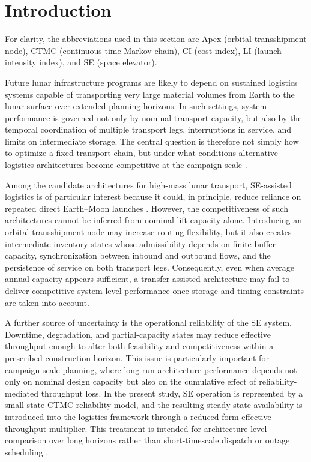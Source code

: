 \documentclass[12pt]{article}
\begin{document}
	\par\medskip
	
	\section{Introduction}
	
	For clarity, the abbreviations used in this section are Apex (orbital transshipment node), CTMC (continuous-time Markov chain), CI (cost index), LI (launch-intensity index), and SE (space elevator).
	
	Future lunar infrastructure programs are likely to depend on sustained logistics systems capable of transporting very large material volumes from Earth to the lunar surface over extended planning horizons. In such settings, system performance is governed not only by nominal transport capacity, but also by the temporal coordination of multiple transport legs, interruptions in service, and limits on intermediate storage. The central question is therefore not simply how to optimize a fixed transport chain, but under what conditions alternative logistics architectures become competitive at the campaign scale \cite{COMAP2026B,Merancy2025ADD,Azami2024LBMC,Xia2025LunarBaseInfra,Vasudeva2026LunarConstruction}.
	
	Among the candidate architectures for high-mass lunar transport, SE-assisted logistics is of particular interest because it could, in principle, reduce reliance on repeated direct Earth--Moon launches \cite{Smitherman2000SpaceElevators,Edwards2000NIAC,Chang2022,Nixon2023TetherMaterials,Swan2023ApexAnchorInitialResearch,Swan2025GalacticHarbours}. However, the competitiveness of such architectures cannot be inferred from nominal lift capacity alone. Introducing an orbital transshipment node may increase routing flexibility, but it also creates intermediate inventory states whose admissibility depends on finite buffer capacity, synchronization between inbound and outbound flows, and the persistence of service on both transport legs. Consequently, even when average annual capacity appears sufficient, a transfer-assisted architecture may fail to deliver competitive system-level performance once storage and timing constraints are taken into account.
	
	A further source of uncertainty is the operational reliability of the SE system. Downtime, degradation, and partial-capacity states may reduce effective throughput enough to alter both feasibility and competitiveness within a prescribed construction horizon. This issue is particularly important for campaign-scale planning, where long-run architecture performance depends not only on nominal design capacity but also on the cumulative effect of reliability-mediated throughput loss. In the present study, SE operation is represented by a small-state CTMC reliability model, and the resulting steady-state availability is introduced into the logistics framework through a reduced-form effective-throughput multiplier. This treatment is intended for architecture-level comparison over long horizons rather than short-timescale dispatch or outage scheduling \cite{Norris1998MarkovChains}.
	
\end{document}
